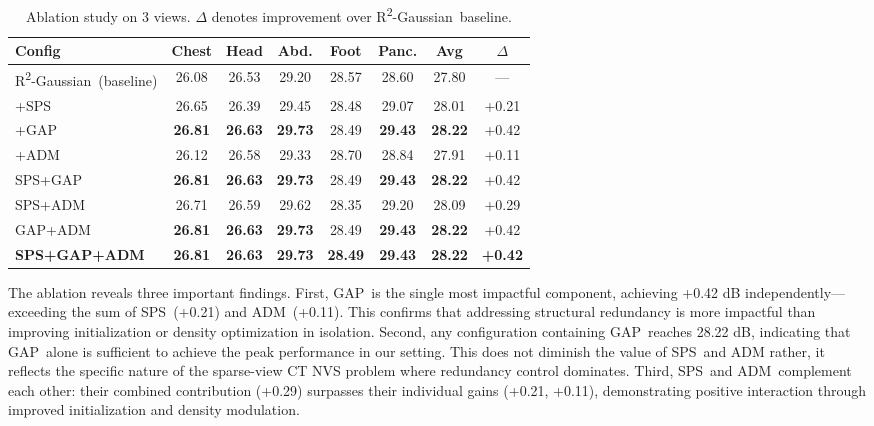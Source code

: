 \documentclass{egPublStyle}
\newcommand{\sps}{SPS}
\newcommand{\gap}{GAP}
\newcommand{\adm}{ADM}
\newcommand{\rtwo}{R\textsuperscript{2}-Gaussian}
\begin{document}
\begin{table}[t]
\centering
\caption{Ablation study on 3 views. $\Delta$ denotes improvement over \rtwo\ baseline.}
\label{tab:ablation}
\setlength{\tabcolsep}{4pt}
\begin{tabular}{lccccccc}
\toprule
\textbf{Config} & \textbf{Chest} & \textbf{Head} & \textbf{Abd.} & \textbf{Foot} & \textbf{Panc.} & \textbf{Avg} & \textbf{$\Delta$} \\
\midrule
\rtwo\ (baseline) & 26.08 & 26.53 & 29.20 & 28.57 & 28.60 & 27.80 & --- \\
\quad +\sps & 26.65 & 26.39 & 29.45 & 28.48 & 29.07 & 28.01 & +0.21 \\
\quad +\gap & \textbf{26.81} & \textbf{26.63} & \textbf{29.73} & 28.49 & \textbf{29.43} & \textbf{28.22} & +0.42 \\
\quad +\adm & 26.12 & 26.58 & 29.33 & 28.70 & 28.84 & 27.91 & +0.11 \\
\sps+\gap & \textbf{26.81} & \textbf{26.63} & \textbf{29.73} & 28.49 & \textbf{29.43} & \textbf{28.22} & +0.42 \\
\sps+\adm & 26.71 & 26.59 & 29.62 & 28.35 & 29.20 & 28.09 & +0.29 \\
\gap+\adm & \textbf{26.81} & \textbf{26.63} & \textbf{29.73} & 28.49 & \textbf{29.43} & \textbf{28.22} & +0.42 \\
\midrule
\textbf{\sps+\gap+\adm} & \textbf{26.81} & \textbf{26.63} & \textbf{29.73} & \textbf{28.49} & \textbf{29.43} & \textbf{28.22} & \textbf{+0.42} \\
\bottomrule
\end{tabular}
\end{table}

The ablation reveals three important findings. First, \gap\ is the single most impactful component, achieving +0.42 dB independently---exceeding the sum of \sps\ (+0.21) and \adm\ (+0.11). This confirms that addressing structural redundancy is more impactful than improving initialization or density optimization in isolation. Second, any configuration containing \gap\ reaches 28.22 dB, indicating that \gap\ alone is sufficient to achieve the peak performance in our setting. This does not diminish the value of \sps\ and \adm\; rather, it reflects the specific nature of the sparse-view CT NVS problem where redundancy control dominates. Third, \sps\ and \adm\ complement each other: their combined contribution (+0.29) surpasses their individual gains (+0.21, +0.11), demonstrating positive interaction through improved initialization and density modulation.
\end{document}
